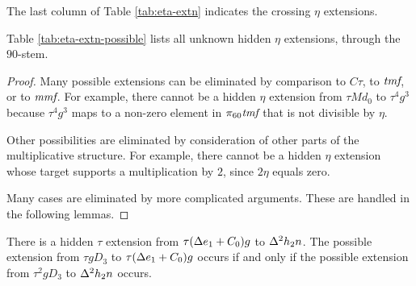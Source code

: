 
\begin{remark}
The last column of Table \ref{tab:eta-extn}
indicates the crossing $\eta$ extensions.
\end{remark}

\begin{thm}
\label{thm:eta-extn-possible}
Table \ref{tab:eta-extn-possible}
lists all unknown hidden $\eta$ extensions, through
the $90$-stem. 
\end{thm}

\begin{proof}
Many possible extensions can be eliminated by
comparison to $C\tau$, to $\textit{tmf}$, or to $\textit{mmf}$.
For example,
there cannot be a hidden $\eta$ extension
from $\tau M d_0$ to $\tau^4 g^3$ because
$\tau^4 g^3$ maps to a non-zero element
in $\pi_{60} \textit{tmf}$ that is not divisible by $\eta$.

Other possibilities are eliminated by consideration of other
parts of the multiplicative structure.  For example,
there cannot be a hidden $\eta$ extension whose target supports
a multiplication by $2$, since $2 \eta$ equals zero.

Many cases are eliminated by more complicated arguments.
These are handled in the following lemmas.
\end{proof}


\begin{remark}
\label{rem:eta-tgD3}
There is a hidden $\tau$ extension from
$\tau (\Delta e_1 + C_0) g$ to $\Delta^2 h_2 n$.
The possible extension from $\tau g D_3$ to 
$\tau (\Delta e_1 + C_0) g$ occurs if and only if
the possible extension from $\tau^2 g D_3$ to
$\Delta^2 h_2 n$ occurs.
\end{remark}


